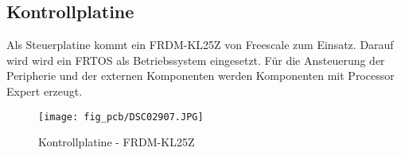 \subsection{Kontrollplatine}
\label{sec:control}
Als Steuerplatine kommt ein FRDM-KL25Z von Freescale zum Einsatz. 
Darauf wird wird ein FRTOS als Betriebssystem eingesetzt. 
Für die Ansteuerung der Peripherie und der externen Komponenten 
werden Komponenten mit Processor Expert erzeugt. 
\begin{figure}[h!]
    \centering
    \texttt{[image: fig\_pcb/DSC02907.JPG]}
    \caption{Kontrollplatine - FRDM-KL25Z}
    \label{fig:dc}
\end{figure}

